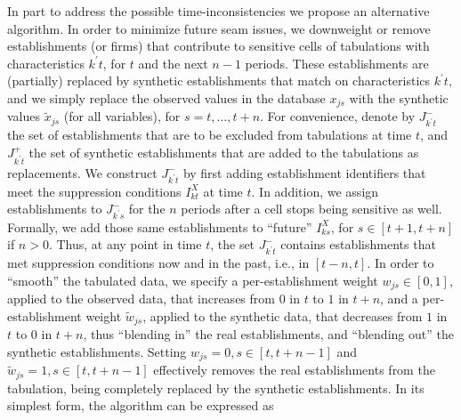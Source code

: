 In part to address the possible time-inconsistencies we propose an 
alternative algorithm.  In order to minimize future seam issues, we downweight or remove 
establishments (or 
firms) that 
contribute to sensitive cells of tabulations with characteristics $k^\prime t$, for $t$ and the next 
$n-1$ periods. These establishments are (partially) replaced by  synthetic establishments that 
match on 
characteristics $k^\prime t$, and we simply replace the observed values in the database $x_{js}$ 
with the synthetic values $\tilde{x}_{js}$ (for all variables), for $s=t,\dots,t+n$.  %
%
For convenience, 
denote by $J_{k^\prime t}^-$ the set of establishments that are to be excluded from tabulations at time $t$, and $J_{k^\prime t}^+$ the set of synthetic establishments that are added to the 
tabulations as replacements. We construct $J_{k^\prime t}^-$ by first adding establishment identifiers that meet the suppression conditions $I^X_{kt}$ at time $t$. In addition, we assign establishments to 
$J_{k^\prime s}^-$ for the $n$ periods after a cell stops being sensitive as well. Formally, we  add 
those same establishments to ``future''  $I^X_{ks}$, for $s \in [t+1,t+n]$ if $n>0$. Thus, at any 
point in time $t$, the set $J_{k^\prime t}^-$ contains establishments that met suppression 
conditions now and in the past, i.e.,   in $[t-n,t]$.   
%
In order to ``smooth'' the tabulated data, we specify  a 
per-establishment weight $w_{js} \in [0,1]$, applied to the observed data, that increases from 
$0$ in $t$ to $1$ in $t+n$, 
and  a per-establishment weight $\tilde{w}_{js}$, applied to the synthetic data, that decreases 
from $1$ in $t$ to $0$ in 
$t+n$, thus ``blending in''  the real establishments, and ``blending out'' the synthetic 
establishments. Setting $w_{js} = 0, s \in [t,t+n-1]$ and $\tilde{w}_{js}=1, s \in [t,t+n-1]$ effectively 
removes the real establishments from the tabulation, being completely  replaced by the synthetic 
establishments.
%
In its simplest 
form, the algorithm can be expressed as

